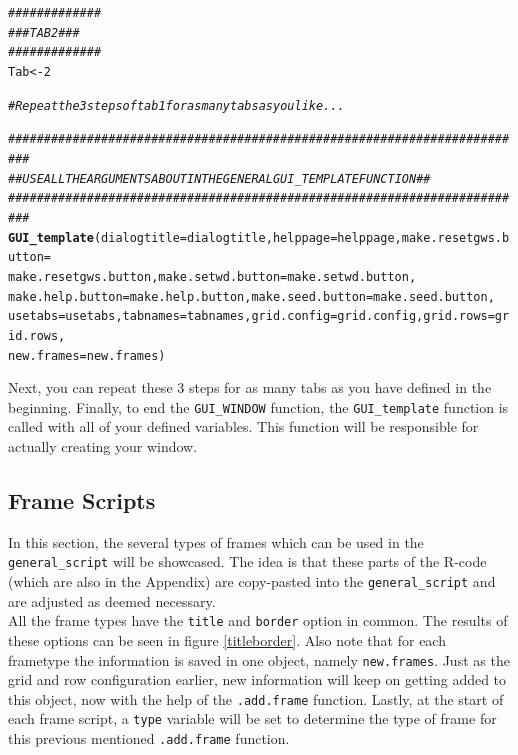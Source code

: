\documentclass[a4paper]{article}\usepackage[]{graphicx}\usepackage[]{color}
\makeatletter
\newcommand{\hlnum}[1]{\textcolor[rgb]{0.686,0.059,0.569}{#1}}%
\newcommand{\hlcom}[1]{\textcolor[rgb]{0.678,0.584,0.686}{\textit{#1}}}%
\newcommand{\hlstd}[1]{\textcolor[rgb]{0.345,0.345,0.345}{#1}}%
\newcommand{\hlkwb}[1]{\textcolor[rgb]{0.69,0.353,0.396}{#1}}%
\newcommand{\hlkwc}[1]{\textcolor[rgb]{0.333,0.667,0.333}{#1}}%
\newcommand{\hlkwd}[1]{\textcolor[rgb]{0.737,0.353,0.396}{\textbf{#1}}}%
\newenvironment{kframe}{%
 \def\at@end@of@kframe{}%
 \ifinner\ifhmode%
  \def\at@end@of@kframe{\end{minipage}}%
  \begin{minipage}{\columnwidth}%
 \fi\fi%
 \def\FrameCommand##1{\hskip\@totalleftmargin \hskip-\fboxsep
 \colorbox{shadecolor}{##1}\hskip-\fboxsep
     \hskip-\linewidth \hskip-\@totalleftmargin \hskip\columnwidth}%
 \MakeFramed {\advance\hsize-\width
   \@totalleftmargin\z@ \linewidth\hsize
   \@setminipage}}%
 {\par\unskip\endMakeFramed%
 \at@end@of@kframe}
\newenvironment{knitrout}{}{} %
\makeatother
\begin{document}
\begin{knitrout}
\color{fgcolor}\begin{kframe}
\begin{alltt}
\hlcom{#############}
\hlcom{### TAB 2 ###}
\hlcom{#############}
\hlstd{Tab} \hlkwb{<-} \hlnum{2}

\hlcom{# Repeat the 3 steps of tab 1 for as many tabs as you like...}


\hlcom{#########################################################################}
\hlcom{## USE ALL THE ARGUMENTS ABOUT IN THE GENERAL GUI_TEMPLATE FUNCTION    ##}
\hlcom{#########################################################################}
\hlkwd{GUI_template}\hlstd{(}\hlkwc{dialogtitle}\hlstd{=dialogtitle,}\hlkwc{helppage}\hlstd{=helppage,}\hlkwc{make.resetgws.button}\hlstd{=}
                \hlstd{make.resetgws.button,}\hlkwc{make.setwd.button}\hlstd{=make.setwd.button,}
                \hlkwc{make.help.button}\hlstd{=make.help.button,}\hlkwc{make.seed.button}\hlstd{=make.seed.button,}
                \hlkwc{usetabs}\hlstd{=usetabs,}\hlkwc{tabnames}\hlstd{=tabnames,}\hlkwc{grid.config}\hlstd{=grid.config,}\hlkwc{grid.rows}\hlstd{=grid.rows,}
                \hlkwc{new.frames}\hlstd{=new.frames)}
\end{alltt}
\end{kframe}
\end{knitrout}
\noindent Next, you can repeat these 3 steps for as many tabs as you have
defined in the beginning. Finally, to end the \verb|GUI_WINDOW| function, the
\verb|GUI_template| function is called with all of your defined variables. This
function will be responsible for actually creating your window.

\subsection{Frame Scripts}
In this section, the several types of frames which can be used in the
\verb|general_script| will be showcased. The idea is that these parts of the
R-code (which are also in the Appendix) are copy-pasted into the
\verb|general_script| and are adjusted as deemed necessary. \\
All the frame types have the \verb|title| and
\verb|border| option in common. The results of these options can be seen in
figure \ref{titleborder}. Also note that for each frametype the information is saved in
one object, namely \verb|new.frames|. Just as the grid and row configuration
earlier, new information will keep on getting added to this object, now with
the help of the \verb|.add.frame| function. Lastly, at the start of each frame
script, a \verb|type| variable will be set to determine the type of frame for
this previous mentioned \verb|.add.frame| function.
\end{document}
